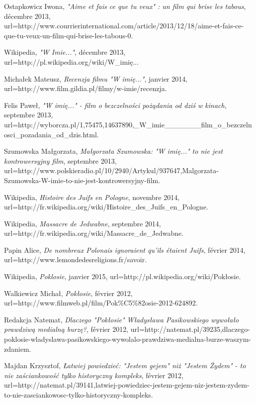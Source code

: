 \documentclass[12pt]{amsart}
\begin{document}
\begin{thebibliography}{100}
	Ostapkowicz Iwona,
	\emph{"Aime et fais ce que tu veux" : un film qui brise les tabous},
	décembre 2013,
	url=http://www.courrierinternational.com/article/2013/12/18/aime-et-fais-ce-que-tu-veux-un-film-qui-brise-les-tabous-0.

	Wikipedia,
	\emph{"W Imie..."},
	décembre 2013,
	url=http://pl.wikipedia.org/wiki/W\_imię...

	Michałek Mateusz,
	\emph{Recenzja filmu "W imię..."},
	janvier 2014,
	url=http://www.film.gildia.pl/filmy/w-imie/recenzja.

	Felis Paweł,
	\emph{"W imię..." - film o bezczelności pożądania od dziś w kinach},
	septembre 2013,
	url=http://wyborcza.pl/1,75475,14637890,\_W\_imie\_\_\_\_\_\_\_film\_o\_bezczelnosci\_pozadania\_od\_dzis.html.


	Szumowska Małgorzata,
	\emph{Małgorzata Szumowska: "W imię..." to nie jest kontrowersyjny film},
	septembre 2013,
	url=http://www.polskieradio.pl/10/2940/Artykul/937647,Malgorzata-Szumowska-W-imie-to-nie-jest-kontrowersyjny-film.

	Wikipedia,
	\emph{Histoire des Juifs en Pologne},
	novembre 2014,
	url=http://fr.wikipedia.org/wiki/Histoire\_des\_Juifs\_en\_Pologne.


	Wikipedia,
	\emph{Massacre de Jedwabne},
	septembre 2014,
	url=http://fr.wikipedia.org/wiki/Massacre\_de\_Jedwabne.

	Papin Alice,
	\emph{De nombreux Polonais ignoraient qu'ils étaient Juifs},
	février 2014,
	url=http://www.lemondedesreligions.fr/savoir.

	Wikipedia,
	\emph{Poklosie},
	janvier 2015,
	url=http://pl.wikipedia.org/wiki/Pokłosie.

	Walkiewicz Michał,
	\emph{Pokłosie},
	février 2012,
	url=http://www.filmweb.pl/film/Pok\%C5\%82osie-2012-624892.

	Redakcja Natemat,
	\emph{Dlaczego "Pokłosie" Władysława Pasikowskiego wywołało prawdziwą medialną burzę?},
	février 2012,
	url=http://natemat.pl/39235,dlaczego-poklosie-wladyslawa-pasikowskiego-wywolalo-prawdziwa-medialna-burze-waszym-zdaniem.

	Majdan Krzysztof,
	\emph{Łatwiej powiedzieć: "Jestem gejem" niż "Jestem Żydem" - to nie zaściankowość tylko historyczny kompleks},
	février 2012,
	url=http://natemat.pl/39141,latwiej-powiedziec-jestem-gejem-niz-jestem-zydem-to-nie-zasciankowosc-tylko-historyczny-kompleks.


\end{thebibliography}
\end{document}

